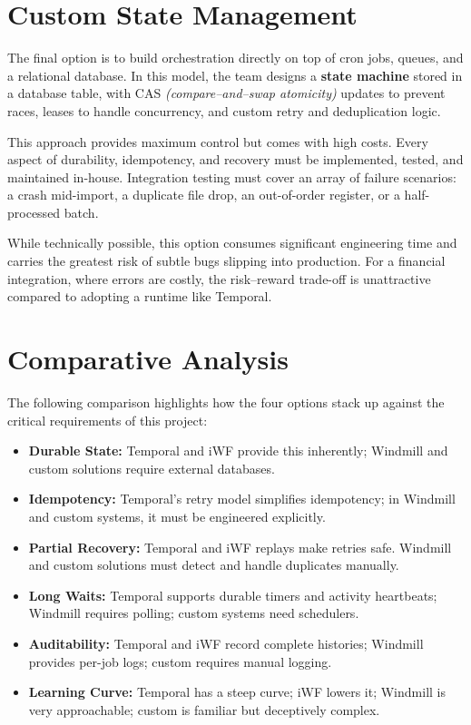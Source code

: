 \documentclass[11pt, a4paper, twocolumn]{article} %
\begin{document}
\section*{Custom State Management}

The final option is to build orchestration directly on top of cron jobs, queues, and a relational database. In this model, the team designs a \textbf{state machine} stored in a database table, with CAS \textit{(compare--and--swap atomicity)} updates to prevent races, leases to handle concurrency, and custom retry and deduplication logic.

This approach provides maximum control but comes with high costs. Every aspect of durability, idempotency, and recovery must be implemented, tested, and maintained in-house. Integration testing must cover an array of failure scenarios: a crash mid-import, a duplicate file drop, an out-of-order register, or a half-processed batch.

While technically possible, this option consumes significant engineering time and carries the greatest risk of subtle bugs slipping into production. For a financial integration, where errors are costly, the risk–reward trade-off is unattractive compared to adopting a runtime like Temporal.

\newpage

\section*{Comparative Analysis}

The following comparison highlights how the four options stack up against the critical requirements of this project:

\begin{itemize}
\item \textbf{Durable State:} Temporal and iWF provide this inherently; Windmill and custom solutions require external databases.
\item \textbf{Idempotency:} Temporal’s retry model simplifies idempotency; in Windmill and custom systems, it must be engineered explicitly.
\item \textbf{Partial Recovery:} Temporal and iWF replays make retries safe. Windmill and custom solutions must detect and handle duplicates manually.
\item \textbf{Long Waits:} Temporal supports durable timers and activity heartbeats; Windmill requires polling; custom systems need schedulers.
\item \textbf{Auditability:} Temporal and iWF record complete histories; Windmill provides per-job logs; custom requires manual logging.
\item \textbf{Learning Curve:} Temporal has a steep curve; iWF lowers it; Windmill is very approachable; custom is familiar but deceptively complex.
\end{itemize}
\end{document}
